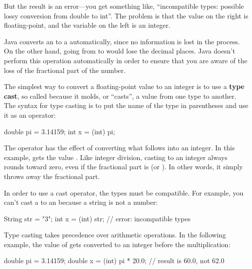 But the result is an error---you get something like, ``incompatible types: possible lossy conversion from double to int''.
The problem is that the value on the right is floating-point, and the variable on the left is an integer.


Java converts an  to a  automatically, since no information is lost in the process.
On the other hand, going from  to  would lose the decimal places.
Java doesn't perform this operation automatically in order to ensure that you are aware of the loss of the fractional part of the number.


The simplest way to convert a floating-point value to an integer is to use a {\bf type cast}, so called because it molds, or ``casts'', a value from one type to another.
The syntax for type casting is to put the name of the type in parentheses and use it as an operator:

\begin{code}
double pi = 3.14159;
int x = (int) pi;
\end{code}

The  operator has the effect of converting what follows into an integer.
In this example,  gets the value .
Like integer division, casting to an integer always rounds toward zero, even if the fractional part is  (or ).
In other words, it simply throws away the fractional part.

In order to use a cast operator, the types must be compatible.
For example, you can't cast a  to an  because a string is not a number:

\begin{code}
String str = "3";
int x = (int) str;  // error: incompatible types
\end{code}

Type casting takes precedence over arithmetic operations.
In the following example, the value of  gets converted to an integer before the multiplication:

\begin{code}
double pi = 3.14159;
double x = (int) pi * 20.0;  // result is 60.0, not 62.0
\end{code}


